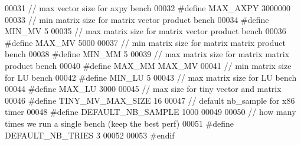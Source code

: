\begin{DoxyCode}
00031 \textcolor{comment}{// max vector size for axpy bench}
00032 \textcolor{preprocessor}{#define MAX\_AXPY 3000000}
00033 \textcolor{comment}{// min matrix size for matrix vector product bench}
00034 \textcolor{preprocessor}{#define MIN\_MV 5}
00035 \textcolor{comment}{// max matrix size for matrix vector product bench}
00036 \textcolor{preprocessor}{#define MAX\_MV 5000}
00037 \textcolor{comment}{// min matrix size for matrix matrix product bench}
00038 \textcolor{preprocessor}{#define MIN\_MM 5}
00039 \textcolor{comment}{// max matrix size for matrix matrix product bench}
00040 \textcolor{preprocessor}{#define MAX\_MM MAX\_MV}
00041 \textcolor{comment}{// min matrix size for LU bench}
00042 \textcolor{preprocessor}{#define MIN\_LU 5}
00043 \textcolor{comment}{// max matrix size for LU bench}
00044 \textcolor{preprocessor}{#define MAX\_LU 3000}
00045 \textcolor{comment}{// max size for tiny vector and matrix}
00046 \textcolor{preprocessor}{#define TINY\_MV\_MAX\_SIZE 16}
00047 \textcolor{comment}{// default nb\_sample for x86 timer}
00048 \textcolor{preprocessor}{#define DEFAULT\_NB\_SAMPLE 1000}
00049 
00050 \textcolor{comment}{// how many times we run a single bench (keep the best perf)}
00051 \textcolor{preprocessor}{#define DEFAULT\_NB\_TRIES 3}
00052 
00053 \textcolor{preprocessor}{#endif}
\end{DoxyCode}
